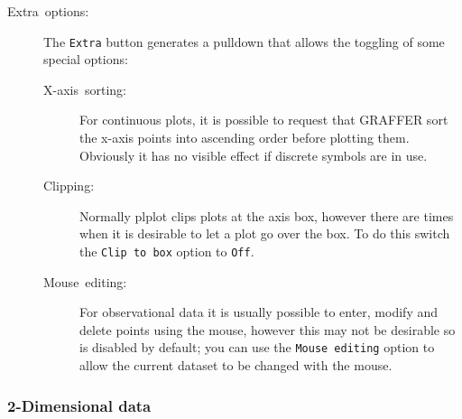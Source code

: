 \documentclass[11pt,twoside,english]{article}
\begin{document}
\begin{description}
\item [Extra~options:]The \texttt{Extra} button generates a pulldown
  that allows the toggling of some special options:

  \begin{description}
  \item [X-axis~sorting:]For continuous plots, it is possible to
    request that GRAFFER sort the x-axis points into ascending order
    before plotting them. Obviously it has no visible effect if
    discrete symbols are in use.
  \item [Clipping:]Normally plplot clips plots at the axis box, however
    there are times when it is desirable to let a plot go over the
    box. To do this switch the \texttt{Clip to box} option to
    \texttt{Off}.
  \item [Mouse~editing:]For observational data it is usually possible
    to enter, modify and delete points using the mouse, however this
    may not be desirable so is disabled by default; you can use the
    \texttt{Mouse editing} option to allow the current dataset to be
    changed with the mouse.
  \end{description}
\end{description}

\subsubsection{2-Dimensional data}
\end{document}
